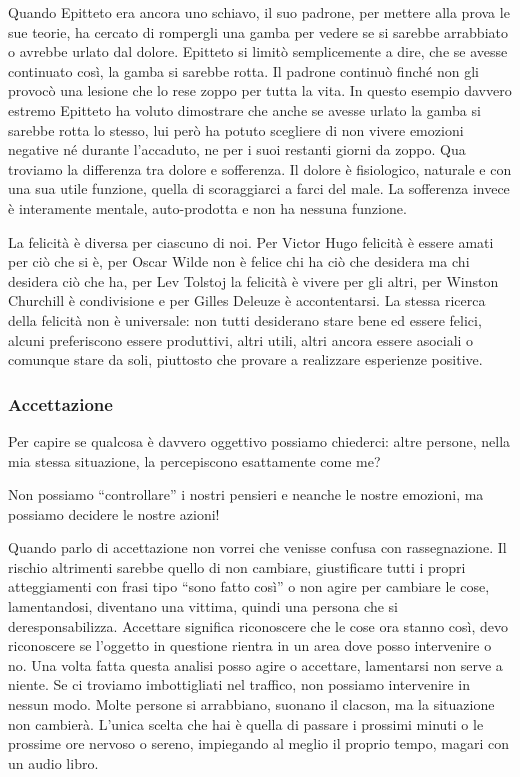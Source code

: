 \documentclass[12pt]{book} %
\begin{document}
Quando Epitteto era ancora uno schiavo, il suo padrone, per mettere alla prova le sue teorie, ha cercato di rompergli
una gamba per vedere se si sarebbe arrabbiato o avrebbe urlato dal dolore. Epitteto si limitò semplicemente a dire, che
se avesse continuato così, la gamba si sarebbe rotta. Il padrone continuò finché non gli provocò una lesione che lo
rese zoppo per tutta la vita. In questo esempio davvero estremo Epitteto ha voluto dimostrare che anche se avesse
urlato la gamba si sarebbe rotta lo stesso, lui però ha potuto scegliere di non vivere emozioni negative né durante
l'accaduto, ne per i suoi restanti giorni da zoppo. Qua troviamo la differenza tra dolore e
sofferenza. Il dolore è fisiologico, naturale e con una sua utile funzione, quella di scoraggiarci a farci del male. La
sofferenza invece è interamente mentale, auto-prodotta e non ha nessuna funzione.

La felicità è diversa per ciascuno di noi. Per Victor Hugo felicità è essere amati per ciò che si è, per Oscar Wilde non
è felice chi ha ciò che desidera ma chi desidera ciò che ha, per Lev Tolstoj la felicità è vivere per gli altri, per
Winston Churchill è condivisione e per Gilles Deleuze è accontentarsi. La stessa ricerca della felicità non è
universale: non tutti desiderano stare bene ed essere felici, alcuni preferiscono essere produttivi, altri utili, altri
ancora essere asociali o comunque stare da soli, piuttosto che provare a realizzare esperienze
positive.

\subsubsection{Accettazione}
Per capire se qualcosa è davvero oggettivo possiamo chiederci: altre persone, nella mia stessa situazione, la
percepiscono esattamente come me?

Non possiamo “controllare” i nostri pensieri e neanche le nostre emozioni, ma possiamo decidere le nostre azioni!

Quando parlo di accettazione non vorrei che venisse confusa con rassegnazione. Il rischio altrimenti sarebbe quello di
non cambiare, giustificare tutti i propri atteggiamenti con frasi tipo “sono fatto così” o non agire per cambiare le
cose, lamentandosi, diventano una vittima, quindi una persona che si deresponsabilizza. Accettare significa riconoscere
che le cose ora stanno così, devo riconoscere se l'oggetto in questione rientra in un area dove
posso intervenire o no. Una volta fatta questa analisi posso agire o accettare, lamentarsi non serve a niente. Se ci
troviamo imbottigliati nel traffico, non possiamo intervenire in nessun modo. Molte persone si arrabbiano, suonano il
clacson, ma la situazione non cambierà. L'unica scelta che hai è quella di passare i prossimi
minuti o le prossime ore nervoso o sereno, impiegando al meglio il proprio tempo, magari con un audio libro. 
\end{document}

